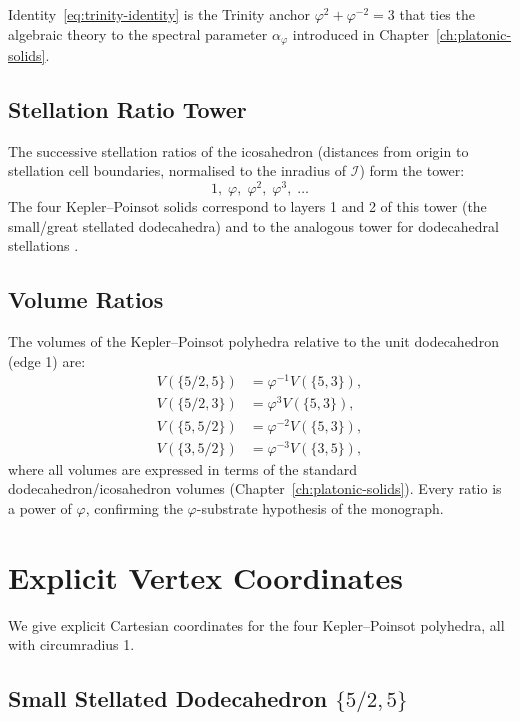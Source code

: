 Identity~\eqref{eq:trinity-identity} is the Trinity anchor
$\varphi^2 + \varphi^{-2} = 3$ that ties the algebraic theory
to the spectral parameter $\alpha_\varphi$ introduced in
Chapter~\ref{ch:platonic-solids}.

\subsection{Stellation Ratio Tower}
\label{ssec:stellation-tower}

The successive stellation ratios of the icosahedron (distances
from origin to stellation cell boundaries, normalised to the
inradius of $\mathcal{I}$) form the tower:
\[
  1,\; \varphi,\; \varphi^2,\; \varphi^3,\; \ldots
\]
The four Kepler–Poinsot solids correspond to layers 1 and 2
of this tower (the small/great stellated dodecahedra) and to
the analogous tower for dodecahedral stellations
\cite{coxeter_fifty_nine_icosahedra}.

\subsection{Volume Ratios}
\label{ssec:volume-ratios}

The volumes of the Kepler–Poinsot polyhedra relative to the
unit dodecahedron (edge 1) are:
\begin{align*}
  V(\{5/2,5\}) &= \varphi^{-1} V(\{5,3\}),\\
  V(\{5/2,3\}) &= \varphi^3 V(\{5,3\}),\\
  V(\{5,5/2\}) &= \varphi^{-2} V(\{5,3\}),\\
  V(\{3,5/2\}) &= \varphi^{-3} V(\{3,5\}),
\end{align*}
where all volumes are expressed in terms of the standard
dodecahedron/icosahedron volumes (Chapter~\ref{ch:platonic-solids}).
Every ratio is a power of $\varphi$, confirming the
$\varphi$-substrate hypothesis of the monograph.

\section{Explicit Vertex Coordinates}
\label{sec:coordinates}

We give explicit Cartesian coordinates for the four
Kepler–Poinsot polyhedra, all with circumradius 1.

\subsection{Small Stellated Dodecahedron \texorpdfstring{$\{5/2,5\}$}{5/2,5}}
\label{ssec:coords-ssd}

